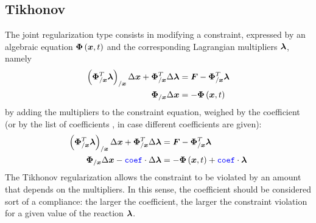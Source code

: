 \subsection{Tikhonov}
The  joint regularization type consists in modifying
a constraint, expressed by an algebraic equation $\boldsymbol{\Phi}\left( \boldsymbol{x}, t \right)$
and the corresponding Lagrangian multipliers $\boldsymbol{\lambda}$, namely
\begin{align}
	\left( \boldsymbol{\Phi}_{/\boldsymbol{x}}^T \boldsymbol{\lambda} \right)_{/\boldsymbol{x}} \Delta\boldsymbol{x}
	+ \boldsymbol{\Phi}_{/\boldsymbol{x}}^T \Delta\boldsymbol{\lambda}
		&= \boldsymbol{F} - \boldsymbol{\Phi}_{/\boldsymbol{x}}^T \boldsymbol{\lambda} \\
	\boldsymbol{\Phi}_{/\boldsymbol{x}} \Delta\boldsymbol{x} &= - \boldsymbol{\Phi}\left( \boldsymbol{x}, t \right)
\end{align}
by adding the multipliers to the constraint equation,
weighed by the coefficient  (or by the list of coefficients
, in case different coefficients are given):
\begin{align}
	\left( \boldsymbol{\Phi}_{/\boldsymbol{x}}^T \boldsymbol{\lambda} \right)_{/\boldsymbol{x}} \Delta\boldsymbol{x}
	+ \boldsymbol{\Phi}_{/\boldsymbol{x}}^T \Delta\boldsymbol{\lambda}
	&= \boldsymbol{F} - \boldsymbol{\Phi}_{/\boldsymbol{x}}^T \boldsymbol{\lambda} \\
	\boldsymbol{\Phi}_{/\boldsymbol{x}} \Delta\boldsymbol{x}
	- \textcolor{blue}{\texttt{coef}} \cdot \Delta\boldsymbol{\lambda}
	&= - \boldsymbol{\Phi}\left( \boldsymbol{x}, t \right) + \textcolor{blue}{\texttt{coef}} \cdot \boldsymbol{\lambda}
\end{align}
The Tikhonov regularization allows the constraint to be violated
by an amount that depends on the multipliers.
In this sense, the coefficient  should be considered
sort of a compliance: the larger the coefficient,
the larger the constraint violation for a given value
of the reaction $\boldsymbol{\lambda}$.

